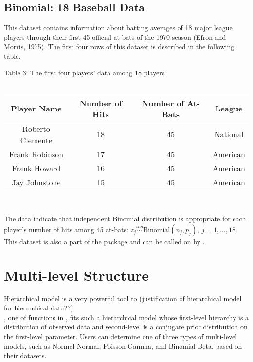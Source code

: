 \documentclass[article]{jss}
\begin{document}
\subsection{Binomial: 18 Baseball Data}
This dataset contains information about batting averages of 18 major league players through their first 45 official at-bats of the 1970 season (Efron and Morris, 1975). The first four rows of this dataset is described in the following table.
\begin{center}
Table 3: The first four players' data among 18 players
\\
~
\\
\begin{tabular}{|c|c|c|c|}
\hline
Player Name & Number of Hits & Number of At-Bats &League\\
\hline
Roberto Clemente & 18 & 45 & National\\
\hline
Frank Robinson & 17 & 45 & American\\
\hline
Frank Howard & 16 & 45 & American\\
\hline
Jay Johnstone & 15 & 45 & American\\
\hline
\end{tabular}
\end{center}
~

The data indicate that independent Binomial distribution is appropriate for each player's number of hits among 45 at-bats: $z_{j}\stackrel{ind}{\sim} \textrm{Binomial}(n_{j}, p_{j}), ~j=1, \ldots, 18$.
\\

This dataset is also a part of the package and can be called on  by .

\section[Multi-level Structure]{Multi-level Structure}
Hierarchical model is a very powerful tool to (justification of hierarchical model for hierarchical data??)
\\

, one of functions in , fits such a hierarchical model whose first-level hierarchy is a distribution of observed data and second-level is a conjugate prior distribution on the first-level parameter. Users can determine one of three types of multi-level models, such as Normal-Normal, Poisson-Gamma, and Binomial-Beta, based on their datasets. 
\\

 
\end{document}
